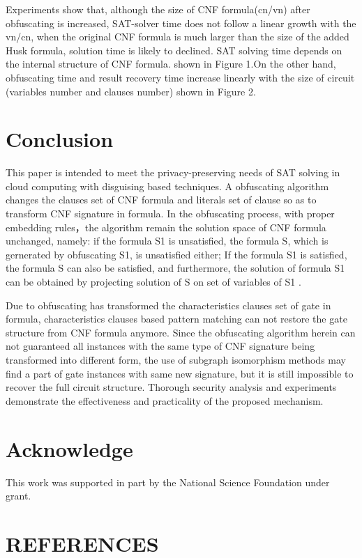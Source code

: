 \documentclass[runningheads,a4paper]{llncs}
\begin{document}
Experiments show that, although the size of CNF formula(cn/vn) after obfuscating is increased, SAT-solver time does not follow a linear growth with the vn/cn, when the original CNF formula is much larger than the size of the added Husk formula, solution time is likely to declined. SAT solving time depends on the internal structure of CNF formula. shown in Figure 1.On the other hand, obfuscating time and result recovery time increase linearly with the size of circuit (variables number and clauses number) shown in Figure 2.
\section{Conclusion} 

This paper is intended to meet the privacy-preserving needs of SAT solving in cloud computing with disguising based techniques. A obfuscating algorithm changes the clauses set of CNF formula and literals set of clause so as to transform CNF signature in formula. In the obfuscating process, with proper embedding rules，the algorithm remain the solution space of CNF formula unchanged, namely: if the formula S1 is unsatisfied, the formula S, which is gernerated by obfuscating S1, is unsatisfied either; If the formula S1 is satisfied, the formula S can also be satisfied, and furthermore, the solution of formula S1 can be obtained by projecting solution of S  on set of variables of S1 .

Due to obfuscating has transformed the characteristics clauses set of gate in formula, characteristics clauses based pattern matching can not restore the gate structure from CNF formula anymore. Since the obfuscating algorithm herein can not guaranteed all instances with the same type of CNF signature being transformed into different form, the use of subgraph isomorphism methods may find a part of gate instances with same new signature, but it is still impossible to recover the full circuit structure. Thorough security analysis and experiments demonstrate the effectiveness and practicality of the proposed mechanism.
\section{Acknowledge} 

This work was supported in part by the National Science Foundation under grant.

\section{REFERENCES} 
\end{document}
